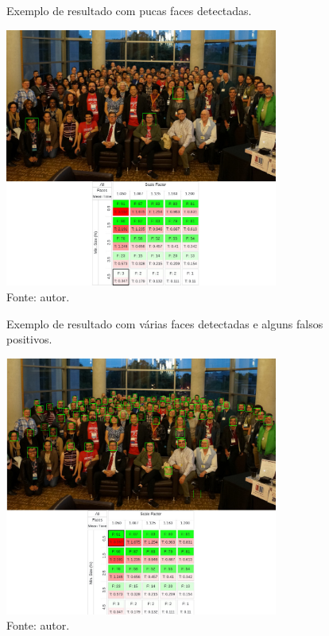 \begin{figure}[h]
    \centering
    \caption[Exemplo de resultado com pucas faces detectadas.]{Exemplo de resultado com pucas faces detectadas.}
    \includegraphics[width=0.8\textwidth]{Cap3_Desenvolvimento/Figures/exemplo_resultado_1.jpg}
    \caption*{Fonte: autor.}
    \label{fig:exemploResultado1}
\end{figure}

\begin{figure}[h]
    \centering
    \caption[Exemplo de resultado com várias faces detectadas e alguns falsos positivos.]{Exemplo de resultado com várias faces detectadas e alguns falsos positivos.}
    \includegraphics[width=0.8\textwidth]{Cap3_Desenvolvimento/Figures/exemplo_resultado_2.jpg}
    \caption*{Fonte: autor.}
    \label{fig:exemploResultado2}
\end{figure}

